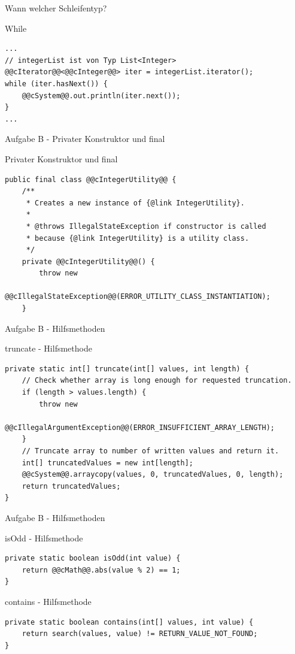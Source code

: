 \documentclass[aspectratio=169]{beamer}
\begin{document}
\begin{frame}[fragile]{Wann welcher Schleifentyp?}
  \begin{exampleblock}{While}
    \begin{lstlisting}
...
// integerList ist von Typ List<Integer>
@@cIterator@@<@@cInteger@@> iter = integerList.iterator();
while (iter.hasNext()) {
    @@cSystem@@.out.println(iter.next());
}
...
    \end{lstlisting}
  \end{exampleblock}
\end{frame}

\begin{frame}[fragile]{Aufgabe B - Privater Konstruktor und final}
  \begin{alertblock}{Privater Konstruktor und \color{keywordcolor}final}
    \begin{lstlisting}
public final class @@cIntegerUtility@@ {
    /**
     * Creates a new instance of {@link IntegerUtility}.
     *
     * @throws IllegalStateException if constructor is called
     * because {@link IntegerUtility} is a utility class.
     */
    private @@cIntegerUtility@@() {
        throw new
            @@cIllegalStateException@@(ERROR_UTILITY_CLASS_INSTANTIATION);
    }
    \end{lstlisting}
  \end{alertblock}
\end{frame}

\begin{frame}[fragile]{Aufgabe B - Hilfsmethoden}
  \begin{block}{truncate - Hilfsmethode}
    \begin{lstlisting}
private static int[] truncate(int[] values, int length) {
    // Check whether array is long enough for requested truncation.
    if (length > values.length) {
        throw new
            @@cIllegalArgumentException@@(ERROR_INSUFFICIENT_ARRAY_LENGTH);
    }
    // Truncate array to number of written values and return it.
    int[] truncatedValues = new int[length];
    @@cSystem@@.arraycopy(values, 0, truncatedValues, 0, length);
    return truncatedValues;
}
    \end{lstlisting}
  \end{block}
\end{frame}

\begin{frame}[fragile]{Aufgabe B - Hilfsmethoden}
  \begin{block}{isOdd - Hilfsmethode}
    \begin{lstlisting}
private static boolean isOdd(int value) {
    return @@cMath@@.abs(value % 2) == 1;
}
    \end{lstlisting}
  \end{block}

  \pause

  \begin{block}{contains - Hilfsmethode}
    \begin{lstlisting}
private static boolean contains(int[] values, int value) {
    return search(values, value) != RETURN_VALUE_NOT_FOUND;
}
    \end{lstlisting}
  \end{block}
\end{frame}
\end{document}
